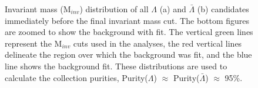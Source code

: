 \documentclass[../AnalysisNoteJBuxton.tex]{subfiles}
\begin{document}
\begin{figure}[h!]
  \centering
  \caption[$\Lambda$ and $\bar{\Lambda}$ Purity]{Invariant mass (M$_{inv}$) distribution of all $\Lambda$ (a) and $\bar{\Lambda}$ (b) candidates immediately before the final invariant mass cut.  The bottom figures are zoomed to show the background with fit.  The vertical green lines represent the M$_{inv}$ cuts used in the analyses, the red vertical lines delineate the region over which the background was fit, and the blue line shows the background fit.  These distributions are used to calculate the collection purities, Purity($\Lambda$) $\approx$ Purity($\bar{\Lambda}$) $\approx$ 95\%.}
  \label{fig:cLamPurity}
\end{figure}
\end{document}
